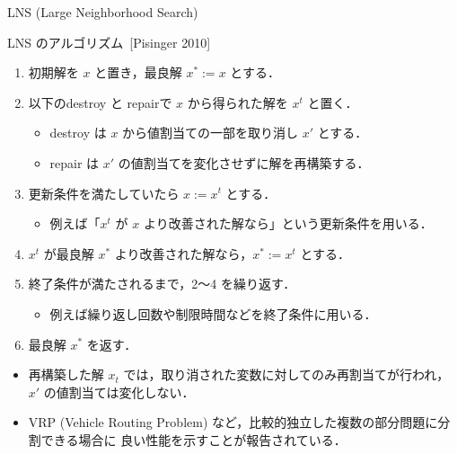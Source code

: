 \documentclass[11pt,dvipdfmx]{beamer}
\begin{document}
\begin{frame}{LNS (Large Neighborhood Search)}
  \begin{block}{LNS のアルゴリズム~[Pisinger 2010]}
    \begin{enumerate}
      \compress
      \item 初期解を $x$ と置き，最良解 $x^{*} := x$ とする．
      \item 以下のdestroy と repairで $x$ から得られた解を $x^{t}$ と置く．
      \begin{itemize}
        \compress
      \item destroy は $x$ から値割当ての一部を取り消し $x'$ とする．
      \item repair は $x'$ の\alert{値割当てを変化させずに解を再構築}する．
      \end{itemize}
      \item 更新条件を満たしていたら $x := x^{t}$ とする．
      \begin{itemize}
        \item 例えば「$x^{t}$ が $x$ より改善された解なら」という更新条件を用いる．
      \end{itemize}
      \item $x^{t}$ が最良解 $x^{*}$ より改善された解なら，$x^{*} := x^{t}$ とする．
      \item 終了条件が満たされるまで，2〜4 を繰り返す．
      \begin{itemize}
        \item 例えば繰り返し回数や制限時間などを終了条件に用いる．
      \end{itemize}
      \item 最良解 $x^{*}$ を返す．
    \end{enumerate}
  \end{block}
  \begin{itemize}
    \item 再構築した解 $x_t$ では，取り消された変数に対してのみ再割当てが行われ，$x'$ の値割当ては変化しない．
    \item VRP (Vehicle Routing Problem) など，比較的独立した複数の部分問題に分割できる場合に
          良い性能を示すことが報告されている．
  \end{itemize}
\end{frame}
\end{document}
